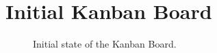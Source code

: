 \documentclass[11pt, a4paper, notitlepage]{report}
\begin{document}
\chapter{Initial Kanban Board}\label{app:KanBan}
\begin{figure}[h]
    \centering
    \caption{Initial state of the Kanban Board.}
    \label{fig:kanbanboardmerged}
\end{figure}
\end{document}
